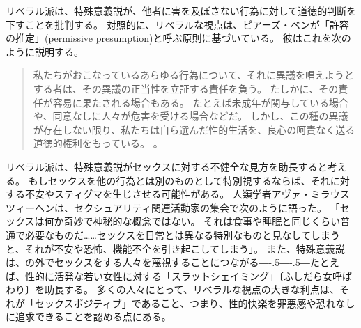 \documentclass[paper=a4,book,openany]{jlreq}
\def\DDASH{―\kern-.5\zw―\kern-.5\zw―} %
\begin{document}
リベラル派は、特殊意義説が、他者に害を及ぼさない行為に対して道徳的判断を下すことを批判する。
対照的に、リベラルな視点は、ピアーズ・ベンが「許容の推定」(permissive presumption)と呼ぶ原則に基づいている。
彼はこれを次のように説明する。
\begin{quote}
  私たちがおこなっているあらゆる行為について、それに異議を唱えようとする者は、その異議の正当性を立証する責任を負う。
たしかに、その責任が容易に果たされる場合もある。
たとえば未成年が関与している場合や、同意なしに人々が危害を受ける場合などだ。
しかし、この種の異議が存在しない限り、私たちは自ら選んだ性的生活を、良心の呵責なく送る道徳的権利をもっている。
\citep[p.237]{benn99:_is_sex_moral_special}。
\end{quote}
リベラル派は、特殊意義説がセックスに対する不健全な見方を助長すると考える。
もしセックスを他の行為とは別のものとして特別視するならば、それに対する不安やスティグマを生じさせる可能性がある。
人類学者アヴァ・ミラウスツィーヘンは、セクシュアリティ関連活動家の集会で次のように語った。
「セックスは何か奇妙で神秘的な概念ではない。
それは食事や睡眠と同じくらい普通で必要なものだ……セックスを日常とは異なる特別なものと見なしてしまうと、それが不安や恐怖、機能不全を引き起こしてしまう」\citep{fein13:_why_sex_is}。
また、特殊意義説は、の外でセックスをする人々を蔑視することにつながる{\DDASH}たとえば、性的に活発な若い女性に対する「スラットシェイミング」〔ふしだら女呼ばわり〕を助長する。
多くの人々にとって、リベラルな視点の大きな利点は、それが「セックスポジティブ」であること、つまり、性的快楽を罪悪感や恐れなしに追求できることを認める点にある。
\end{document}

